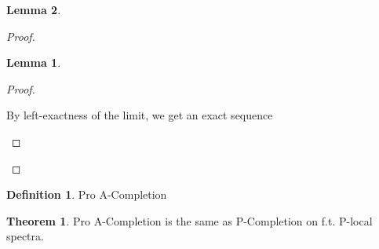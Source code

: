 \documentclass[english]{scrartcl}
\theoremstyle{definition}
\newtheorem*{Def}{Definition}
\newtheorem*{Thm}{Theorem}
\newtheorem*{Lem}{Lemma}
\theoremstyle{remark}
\newcommand*{\Ps}{P}  %
\newcommand*{\pistar}[2][*]{\pi_{#1}(#2)}  %
\newcommand*{\compl}[2][\Ps]{\hat{#2}_{#1}}  %
\begin{document}
\begin{Lem}
\begin{proof}
\begin{Lem}
\begin{proof}
\begin{center}
        \end{center}
        By left-exactness of the limit, we get an exact sequence
        \begin{center}
          \qedhere
        \end{center}
      \end{proof}
    \end{Lem}
  \end{proof}
\end{Lem}

\begin{Def}
  Pro A-Completion
\end{Def}
\begin{Thm}
  Pro A-Completion is the same as P-Completion on f.t. P-local
  spectra.
\end{Thm}

\nocite{*} \printbibliography
\end{document}
